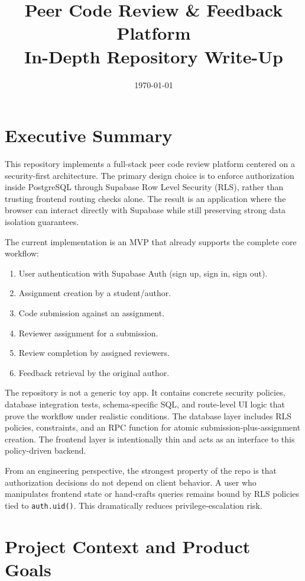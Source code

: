 \documentclass[11pt]{article}
\title{Peer Code Review \& Feedback Platform\\In-Depth Repository Write-Up}
\author{}
\date{\today}
\begin{document}
\onehalfspacing
\maketitle
\tableofcontents
\newpage

\section{Executive Summary}
This repository implements a full-stack peer code review platform centered on a security-first architecture. The primary design choice is to enforce authorization inside PostgreSQL through Supabase Row Level Security (RLS), rather than trusting frontend routing checks alone. The result is an application where the browser can interact directly with Supabase while still preserving strong data isolation guarantees.

The current implementation is an MVP that already supports the complete core workflow:
\begin{enumerate}[leftmargin=*]
  \item User authentication with Supabase Auth (sign up, sign in, sign out).
  \item Assignment creation by a student/author.
  \item Code submission against an assignment.
  \item Reviewer assignment for a submission.
  \item Review completion by assigned reviewers.
  \item Feedback retrieval by the original author.
\end{enumerate}

The repository is not a generic toy app. It contains concrete security policies, database integration tests, schema-specific SQL, and route-level UI logic that prove the workflow under realistic conditions. The database layer includes RLS policies, constraints, and an RPC function for atomic submission-plus-assignment creation. The frontend layer is intentionally thin and acts as an interface to this policy-driven backend.

From an engineering perspective, the strongest property of the repo is that authorization decisions do not depend on client behavior. A user who manipulates frontend state or hand-crafts queries remains bound by RLS policies tied to \texttt{auth.uid()}. This dramatically reduces privilege-escalation risk.

\section{Project Context and Product Goals}
\end{document}
